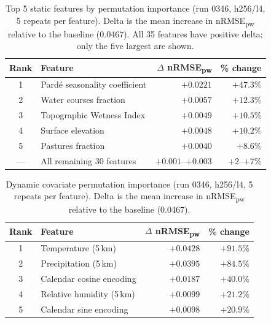 \begin{table}[htbp]
\centering
\caption{Top 5 static features by permutation importance (run 0346, h256/l4, 5 repeats per
feature). Delta is the mean increase in nRMSE\textsubscript{pw} relative to the baseline
(0.0467). All 35 features have positive delta; only the five largest are shown.}
\label{tab:perm_importance}
\begin{tabular}{clrr}
\toprule
\textbf{Rank} & \textbf{Feature} & \textbf{$\Delta$ nRMSE\textsubscript{pw}} & \textbf{\% change} \\
\midrule
1 & Pardé seasonality coefficient        & $+0.0221$ & $+47.3\%$ \\
2 & Water courses fraction               & $+0.0057$ & $+12.3\%$ \\
3 & Topographic Wetness Index            & $+0.0049$ & $+10.5\%$ \\
4 & Surface elevation                    & $+0.0048$ & $+10.2\%$ \\
5 & Pastures fraction                    & $+0.0040$ & $+8.6\%$  \\
\midrule
--- & All remaining 30 features & $+0.001$--$+0.003$ & $+2$--$+7\%$ \\
\bottomrule
\end{tabular}
\end{table}

\begin{table}[htbp]
\centering
\caption{Dynamic covariate permutation importance (run 0346, h256/l4, 5 repeats per
feature). Delta is the mean increase in nRMSE\textsubscript{pw} relative to the baseline
(0.0467).}
\label{tab:perm_importance_dynamic}
\begin{tabular}{clrr}
\toprule
\textbf{Rank} & \textbf{Feature} & \textbf{$\Delta$ nRMSE\textsubscript{pw}} & \textbf{\% change} \\
\midrule
1 & Temperature (5\,km)          & $+0.0428$ & $+91.5\%$ \\
2 & Precipitation (5\,km)        & $+0.0395$ & $+84.5\%$ \\
3 & Calendar cosine encoding     & $+0.0187$ & $+40.0\%$ \\
4 & Relative humidity (5\,km)   & $+0.0099$ & $+21.2\%$ \\
5 & Calendar sine encoding       & $+0.0098$ & $+20.9\%$ \\
\bottomrule
\end{tabular}
\end{table}

